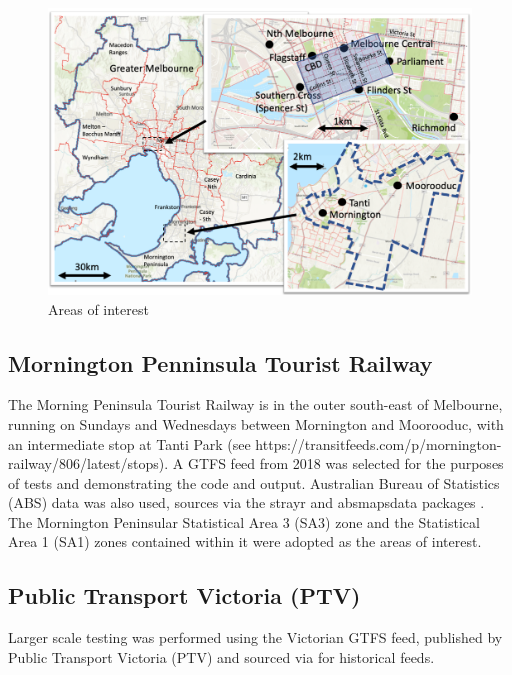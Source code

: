 \documentclass[preprint, 3p,
authoryear]{elsarticle} %
\begin{document}
\begin{figure}
\includegraphics[width=1\linewidth]{graphics/all_maps} \caption{Areas of interest}\label{fig:Melbourne_map}
\end{figure}

\hypertarget{mornington-penninsula-tourist-railway}{%
\subsection{Mornington Penninsula Tourist
Railway}\label{mornington-penninsula-tourist-railway}}

The Morning Peninsula Tourist Railway is in the outer south-east of
Melbourne, running on Sundays and Wednesdays between Mornington and
Moorooduc, with an intermediate stop at Tanti Park (see
https://transitfeeds.com/p/mornington-railway/806/latest/stops). A GTFS
feed from 2018 was selected for the purposes of tests and demonstrating
the code and output. Australian Bureau of Statistics (ABS) data was also
used, sources via the strayr and absmapsdata packages \citep{r-strayr}.
The Mornington Peninsular Statistical Area 3 (SA3) zone and the
Statistical Area 1 (SA1) zones contained within it were adopted as the
areas of interest.

\hypertarget{public-transport-victoria-ptv}{%
\subsection{Public Transport Victoria
(PTV)}\label{public-transport-victoria-ptv}}

Larger scale testing was performed using the Victorian GTFS feed,
published by Public Transport Victoria (PTV) and sourced via
\citet{transitfeeds_victoria:2023aa} for historical feeds.
\end{document}
